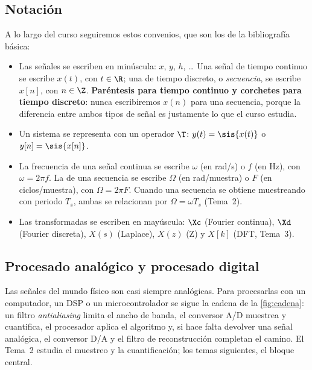 \documentclass[11pt,a4paper]{scrartcl}
\begin{document}
\subsection{Notación}

A lo largo del curso seguiremos estos convenios, que son los de la bibliografía básica:
\begin{itemize}
  \item Las señales se escriben en minúscula: $x$, $y$, $h$, \ldots{} Una señal de tiempo continuo se escribe $x(t)$, con $t\in\R$; una de tiempo discreto, o \emph{secuencia}, se escribe $x[n]$, con $n\in\Z$. \textbf{Paréntesis para tiempo continuo y corchetes para tiempo discreto}: nunca escribiremos $x(n)$ para una secuencia, porque la diferencia entre ambos tipos de señal es justamente lo que el curso estudia.
  \item Un sistema se representa con un operador $\T$: $y(t)=\sis{x(t)}$ o $y[n]=\sis{x[n]}$.
  \item La frecuencia de una señal continua se escribe $\omega$ (en rad/s) o $f$ (en Hz), con $\omega=2\pi f$. La de una secuencia se escribe $\Omega$ (en rad/muestra) o $F$ (en ciclos/muestra), con $\Omega=2\pi F$. Cuando una secuencia se obtiene muestreando con periodo $T_s$, ambas se relacionan por $\Omega=\omega T_s$ (Tema~2).
  \item Las transformadas se escriben en mayúscula: $\Xc$ (Fourier continua), $\Xd$ (Fourier discreta), $X(s)$ (Laplace), $X(z)$ (Z) y $X[k]$ (DFT, Tema~3).
\end{itemize}

\subsection{Procesado analógico y procesado digital}

Las señales del mundo físico son casi siempre analógicas. Para procesarlas con un computador, un DSP o un microcontrolador se sigue la cadena de la \cref{fig:cadena}: un filtro \emph{antialiasing} limita el ancho de banda, el conversor A/D muestrea y cuantifica, el procesador aplica el algoritmo y, si hace falta devolver una señal analógica, el conversor D/A y el filtro de reconstrucción completan el camino. El Tema~2 estudia el muestreo y la cuantificación; los temas siguientes, el bloque central.
\end{document}
